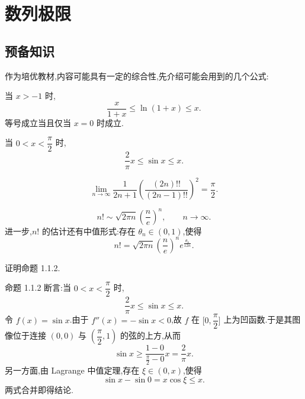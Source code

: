\setcounter{chapter}{0}
\pagestyle{fancy}

\chapter{数列极限}


\section{预备知识}

作为培优教材,内容可能具有一定的综合性,先介绍可能会用到的几个公式:

\begin{proposition}
  当 $x>-1$ 时,
  \[
    \dfrac{x}{1+x}\leq \ln(1+x)\leq x.
  \]
  等号成立当且仅当 $x=0$ 时成立.
\end{proposition}

\begin{proposition}[\marktwostar]
  当 $0<x<\dfrac{\pi}{2}$ 时,
  \[
    \dfrac{2}{\pi}x\leq \sin x\leq x.
  \]
\end{proposition}

\begin{theorem}
  \[
    \lim\limits_{n\to\infty}
    \dfrac{1}{2n+1}
    \left(\dfrac{(2n)!!}{(2n-1)!!}\right)^2
    =\dfrac{\pi}{2}.
  \]
\end{theorem}

\begin{theorem}
  \[
    n!\sim \sqrt{2\pi n}\left(\dfrac{n}{e}\right)^n,
    \qquad n\to\infty.
  \]
  进一步,$n!$ 的估计还有中值形式:存在 $\theta_n\in(0,1)$,使得
  \[
    n!
    =\sqrt{2\pi n}\left(\dfrac{n}{e}\right)^n
    e^{\frac{\theta_n}{12n}}.
  \]
\end{theorem}

\begin{example}
  证明命题 1.1.2.
\end{example}
\exampleblank

\begin{solution}
  命题 1.1.2 断言:当 $0<x<\dfrac{\pi}{2}$ 时,
  \[
    \dfrac{2}{\pi}x\leq \sin x\leq x.
  \]
  令 $f(x)=\sin x$.由于 $f''(x)=-\sin x<0$,故 $f$ 在
  $\lbrack0,\dfrac{\pi}{2}\rbrack$ 上为凹函数.于是其图像位于连接
  $(0,0)$ 与 $(\dfrac{\pi}{2},1)$ 的弦的上方,从而
  \[
    \sin x\geq \dfrac{1-0}{\frac{\pi}{2}-0}x=\dfrac{2}{\pi}x.
  \]
  另一方面,由 Lagrange 中值定理,存在 $\xi\in(0,x)$,使得
  \[
    \sin x-\sin0=x\cos\xi\leq x.
  \]
  两式合并即得结论.
\end{solution}


